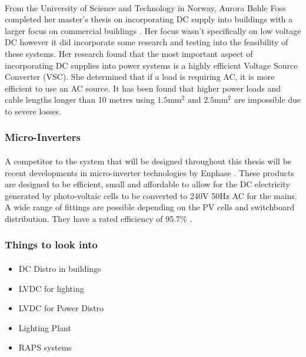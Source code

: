 \paragraph{}
From the University of Science and Technology in Norway, Aurora Bøhle Foss completed her master's thesis on incorporating DC supply into buildings with a larger focus on commercial buildings \cite{Foss2014}. Her focus wasn't specifically on low voltage DC however it did incorporate some research and testing into the feasibility of these systems. Her research found that the most important aspect of incorporating DC supplies into power systems is a highly efficient Voltage Source Converter (VSC). She determined that if a load is requiring AC, it is more efficient to use an AC source. It has been found that higher power loads and cable lengths longer than 10 metres using  $1.5\text{mm}^{2}$ and  $2.5\text{mm}^{2}$ are impossible due to severe losses.

\subsubsection{Micro-Inverters}

\paragraph{}
A competitor to the system that will be designed throughout this thesis will be recent developments in micro-inverter technologies by Enphase \cite{website:Enphase}. These products are designed to be efficient, small and affordable to allow for the DC electricity generated by photo-voltaic cells to be converted to 240V 50Hz AC for the mains. A wide range of fittings are possible depending on the PV cells and switchboard distribution. They have a rated efficiency of 95.7\% \cite{website:Enphase}. 

\subsubsection{Things to look into}

\paragraph{}

\begin{itemize}[noitemsep]
\item DC Distro in buildings
\item LVDC for lighting
\item LVDC for Power Distro
\item Lighting Plant
\item RAPS systems
\end{itemize}      




\newpage
